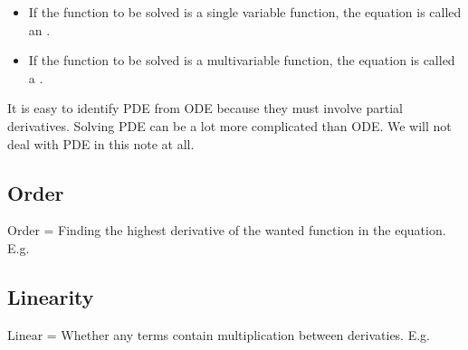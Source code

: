 \documentclass[class=article, crop=false, 12pt]{standalone}
\begin{document}
\begin{itemize}
    \item If the function to be solved is a single variable function, 
    the equation is called an .

    \item If the function to be solved is a multivariable function,
    the equation is called a . 
\end{itemize}

It is easy to identify PDE from ODE because they must involve partial derivatives.
Solving PDE can be a lot more complicated than ODE. 
We will not deal with PDE in this note at all.

\subsection{Order}

Order = Finding the highest derivative of the wanted function in the equation. E.g.


\subsection{Linearity}

Linear = Whether any terms contain multiplication between derivaties. E.g.
\end{document}
